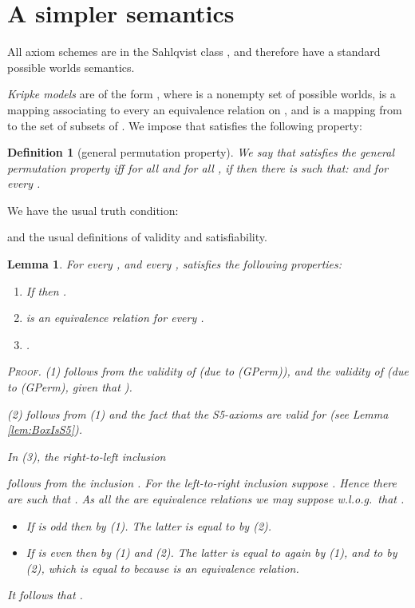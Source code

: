 \documentclass{article}
\newtheorem{definition}{Definition}
\newtheorem{lemma}{Lemma}
\newenvironment{pf}{\em \medskip\noindent \textsc{Proof.}}
{\hspace*{\fill}\nolinebreak[2]\hspace*{\fill}\medskip}
\begin{document}
\goodbreak
\section{A simpler semantics}\label{sec:newSemantics}


All axiom schemes are in the Sahlqvist class \cite{Blackburn:2001:ML},
and therefore have a standard possible worlds semantics.

\emph{Kripke models} are of the form
, where
 is a nonempty set of possible worlds,
 is a mapping associating to every  an equivalence relation  on ,
and  is a mapping from  to the set of subsets of .
We impose that  satisfies the following property:

\begin{definition}[general permutation property]
We say that  satisfies the \emph{general permutation property} iff
for all  and for all ,
if  then there is  such that:
 and 
for every .
\end{definition}


We have the usual truth condition:

and the usual definitions of validity and satisfiability.

\begin{lemma}\label{lem:prop-rel}
For every , and every ,  satisfies
the following properties:
\begin{enumerate}
\item If  then .

\item  is an equivalence relation for every .

\item .
\end{enumerate}

\begin{pf}
(1) follows from the validity of
 (due to (GPerm)), and
the validity of
 (due to (GPerm),
given that ).

(2) follows from (1) and the fact that the S5-axioms are valid for 
(see Lemma \ref{lem:BoxIsS5}).

In (3), the right-to-left inclusion

follows from the inclusion
.
For the left-to-right inclusion
suppose .
Hence there are  such that
.
As all the  are equivalence relations we may suppose w.l.o.g.\ that
.
\begin{itemize}
\item If  is odd then
 by (1).
The latter is equal to  by (2).

\item If  is even then
 by (1) and (2).
The latter is equal to                 again by (1),
and to  by (2),
which is equal to  because  is an equivalence relation.
\end{itemize}
It follows that .

\end{pf}
\end{lemma}
\end{document}
